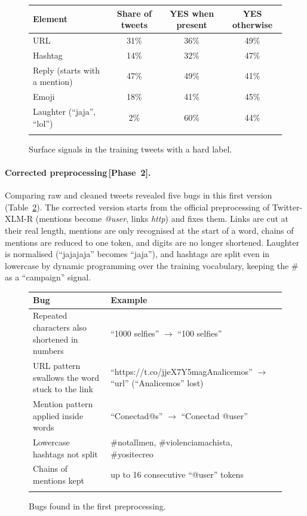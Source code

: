 \documentclass[pdflatex,sn-mathphys-num]{sn-jnl}
\makeatletter
\newenvironment{Htable}{\begin{figure}[H]\def\@captype{table}\begin{center}\begin{threeparttable}\tablebodyfont}{\end{threeparttable}\end{center}\end{figure}}
\newcommand{\Ptwo}{\,{\normalfont\textsf{\small[Phase~2]}}}
\makeatother
\begin{document}
\begin{Htable}
\caption{Surface signals in the training tweets with a hard label.}\label{tab:signals}
\begin{tabular}{@{}lccc@{}}
\toprule
Element & Share of tweets & YES when present & YES otherwise \\
\midrule
URL & 31\% & 36\% & 49\% \\
Hashtag & 14\% & 32\% & 47\% \\
Reply (starts with a mention) & 47\% & 49\% & 41\% \\
Emoji & 18\% & 41\% & 45\% \\
Laughter (``jaja'', ``lol'') & 2\% & 60\% & 44\% \\
\botrule
\end{tabular}
\end{Htable}

\paragraph{Corrected preprocessing\Ptwo.} Comparing raw and cleaned tweets revealed five bugs in this first version (Table~\ref{tab:bugs}). The corrected version starts from the official preprocessing of Twitter-XLM-R (mentions become \emph{@user}, links \emph{http}) and fixes them. Links are cut at their real length, mentions are only recognised at the start of a word, chains of mentions are reduced to one token, and digits are no longer shortened. Laughter is normalised (``jajajaja'' becomes ``jaja''), and hashtags are split even in lowercase by dynamic programming over the training vocabulary, keeping the \# as a ``campaign'' signal.

\begin{Htable}
\caption{Bugs found in the first preprocessing.}\label{tab:bugs}
\begin{tabularx}{\textwidth}{@{}lX@{}}
\toprule
Bug & Example \\
\midrule
Repeated characters also shortened in numbers & ``1000 selfies'' $\rightarrow$ ``100 selfies'' \\
URL pattern swallows the word stuck to the link & ``https://t.co/jjeX7Y5magAnalicemos'' $\rightarrow$ ``url'' (``Analicemos'' lost) \\
Mention pattern applied inside words & ``Conectad@s'' $\rightarrow$ ``Conectad @user'' \\
Lowercase hashtags not split & \#notallmen, \#violenciamachista, \#yositecreo \\
Chains of mentions kept & up to 16 consecutive ``@user'' tokens \\
\botrule
\end{tabularx}
\end{Htable}
\end{document}
